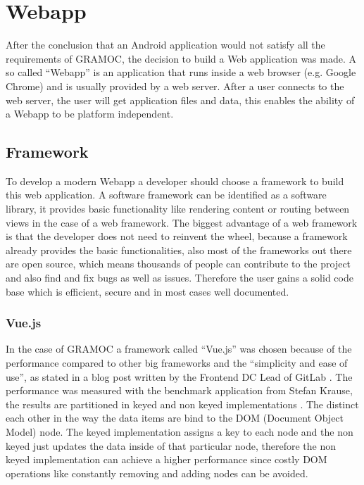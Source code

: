 \chapter{Webapp}
\label{ch:Webapp}

\author{Nico Leidenfrost}

After the conclusion that an Android application would not satisfy all the requirements of GRAMOC, the decision to build a Web application was made. A so called ``Webapp'' is an application that runs inside a web browser (e.g. Google Chrome) and is usually provided by a web server. After a user connects to the web server, the user will get application files and data, this enables the ability of a Webapp to be platform independent.

\section{Framework}
To develop a modern Webapp a developer should choose a framework to build this web application. A software framework can be identified as a software library, it provides basic functionality like rendering content or routing between views in the case of a web framework. The biggest advantage of a web framework is that the developer does not need to reinvent the wheel, because a framework already provides the basic functionalities, also most of the frameworks out there are open source, which means thousands of people can contribute to the project and also find and fix bugs as well as issues. Therefore the user gains a solid code base which is efficient, secure and in most cases well documented.

\subsection{Vue.js}
In the case of GRAMOC a framework called ``Vue.js'' was chosen because of the performance compared to other big frameworks and the ``simplicity and ease of use'', as stated in a blog post written by the Frontend DC Lead of GitLab \cite{Vue} \cite{WhyVue} \cite{GitLab}. The performance was measured with the benchmark application from Stefan Krause, the results are partitioned in keyed and non keyed implementations \cite{FrameworkBenchmark}. The distinct each other in the way the data items are bind to the DOM (Document Object Model) node. The keyed implementation assigns a key to each node and the non keyed just updates the data inside of that particular node, therefore the non keyed implementation can achieve a higher performance since costly DOM operations like constantly removing and adding nodes can be avoided.

